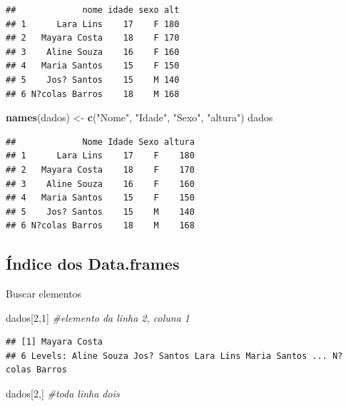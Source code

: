 \documentclass[]{book}
\newenvironment{Shaded}{\begin{snugshade}}{\end{snugshade}}
\newcommand{\CommentTok}[1]{\textcolor[rgb]{0.56,0.35,0.01}{\textit{#1}}}
\newcommand{\DecValTok}[1]{\textcolor[rgb]{0.00,0.00,0.81}{#1}}
\newcommand{\KeywordTok}[1]{\textcolor[rgb]{0.13,0.29,0.53}{\textbf{#1}}}
\newcommand{\NormalTok}[1]{#1}
\newcommand{\StringTok}[1]{\textcolor[rgb]{0.31,0.60,0.02}{#1}}
\begin{document}
\begin{verbatim}
##             nome idade sexo alt
## 1      Lara Lins    17    F 180
## 2   Mayara Costa    18    F 170
## 3    Aline Souza    16    F 160
## 4   Maria Santos    15    F 150
## 5    Jos? Santos    15    M 140
## 6 N?colas Barros    18    M 168
\end{verbatim}

\begin{Shaded}
\begin{Highlighting}[]
\KeywordTok{names}\NormalTok{(dados) <-}\StringTok{ }\KeywordTok{c}\NormalTok{(}\StringTok{"Nome"}\NormalTok{, }\StringTok{"Idade"}\NormalTok{, }\StringTok{"Sexo"}\NormalTok{, }\StringTok{"altura"}\NormalTok{)}
\NormalTok{dados}
\end{Highlighting}
\end{Shaded}

\begin{verbatim}
##             Nome Idade Sexo altura
## 1      Lara Lins    17    F    180
## 2   Mayara Costa    18    F    170
## 3    Aline Souza    16    F    160
## 4   Maria Santos    15    F    150
## 5    Jos? Santos    15    M    140
## 6 N?colas Barros    18    M    168
\end{verbatim}

\hypertarget{indice-dos-data.frames}{%
\subsection{Índice dos Data.frames}\label{indice-dos-data.frames}}

Buscar elementos

\begin{Shaded}
\begin{Highlighting}[]
\NormalTok{dados[}\DecValTok{2}\NormalTok{,}\DecValTok{1}\NormalTok{] }\CommentTok{#elemento da  linha  2, coluna 1}
\end{Highlighting}
\end{Shaded}

\begin{verbatim}
## [1] Mayara Costa
## 6 Levels: Aline Souza Jos? Santos Lara Lins Maria Santos ... N?colas Barros
\end{verbatim}

\begin{Shaded}
\begin{Highlighting}[]
\NormalTok{dados[}\DecValTok{2}\NormalTok{,] }\CommentTok{#toda linha dois}
\end{Highlighting}
\end{Shaded}
\end{document}
